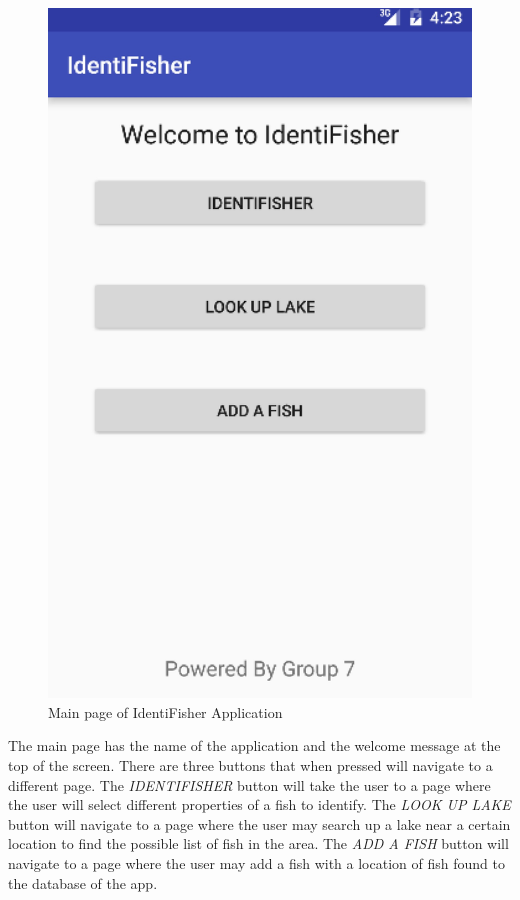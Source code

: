\documentclass{article}
\begin{document}
\begin{figure}[H]
	\includegraphics[scale=0.16]{Mainpage.png}
	\caption{Main page of IdentiFisher Application}
\end{figure}

The main page has the name of the application and the welcome message at the top of the screen. There are three
buttons that when pressed will navigate to a different page. The  \textit{IDENTIFISHER} button will take the user to a page
where the user will select different properties of a fish to identify. The \textit{LOOK UP LAKE} button will navigate to a page where the
user may search up a lake near a certain location to find the possible list of fish in the area. The \textit{ADD A FISH} button will navigate
to a page where the user may add a fish with a location of fish found to the database of the app.\\
\end{document}
